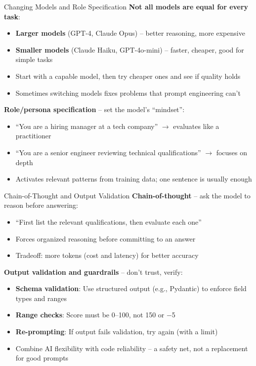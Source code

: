 \documentclass[aspectratio=169]{beamer}
\begin{document}
\begin{frame}{Changing Models and Role Specification}
\textbf{Not all models are equal for every task}:
\begin{itemize}
    \item \textbf{Larger models} (GPT-4, Claude Opus) -- better reasoning, more expensive
    \item \textbf{Smaller models} (Claude Haiku, GPT-4o-mini) -- faster, cheaper, good for simple tasks
    \item Start with a capable model, then try cheaper ones and see if quality holds
    \item Sometimes switching models fixes problems that prompt engineering can't
\end{itemize}
\vspace{0.3cm}

\textbf{Role/persona specification} -- set the model's ``mindset'':
\begin{itemize}
    \item ``You are a hiring manager at a tech company'' $\rightarrow$ evaluates like a practitioner
    \item ``You are a senior engineer reviewing technical qualifications'' $\rightarrow$ focuses on depth
    \item Activates relevant patterns from training data; one sentence is usually enough
\end{itemize}
\end{frame}

\begin{frame}{Chain-of-Thought and Output Validation}
\textbf{Chain-of-thought} -- ask the model to reason before answering:
\begin{itemize}
    \item ``First list the relevant qualifications, then evaluate each one''
    \item Forces organized reasoning before committing to an answer
    \item Tradeoff: more tokens (cost and latency) for better accuracy
\end{itemize}
\vspace{0.3cm}

\textbf{Output validation and guardrails} -- don't trust, verify:
\begin{itemize}
    \item \textbf{Schema validation}: Use structured output (e.g., Pydantic) to enforce field types and ranges
    \item \textbf{Range checks}: Score must be 0--100, not 150 or $-$5
    \item \textbf{Re-prompting}: If output fails validation, try again (with a limit)
    \item Combine AI flexibility with code reliability -- a safety net, not a replacement for good prompts
\end{itemize}
\end{frame}
\end{document}
